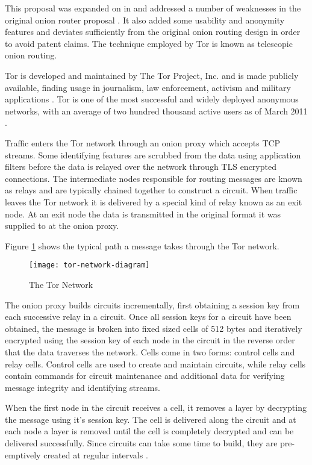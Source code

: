 \documentclass{ecuthesis}
\begin{document}
This proposal was expanded on in  and addressed a
number of weaknesses in the original onion router proposal
\parencite{Dingledine:2004p314}. It also added some usability and anonymity
features and deviates sufficiently from the original onion routing design in
order to avoid patent claims. The technique employed by Tor is known as
telescopic onion routing.

Tor is developed and maintained  by The Tor Project, Inc. and is made publicly
available, finding usage in journalism, law enforcement, activism and military
applications \parencite{The-Tor-Project-Inc.:2011uq}. Tor is one of the most
successful and widely deployed anonymous networks, with an average of two
hundred thousand active users as of March 2011
\parencite{The-Tor-Project-Inc.:2011fk}.

Traffic enters the Tor network through an onion proxy which accepts TCP streams.
Some identifying features are scrubbed from the data using application filters
before the data is relayed over the network through TLS \parencite{website:TLS}
encrypted connections. The intermediate nodes responsible for routing messages
are known as relays and are typically chained together to construct a circuit.
When traffic leaves the Tor network it is delivered by a special kind of relay
known as an exit node. At an exit node the data is transmitted in the original
format it was supplied to at the onion proxy.

Figure \ref{tor-network} shows the typical path a message takes through the Tor
network.

\begin{figure}[H]
  \centering\texttt{[image: tor-network-diagram]}
  \caption{The Tor Network}
  \label{tor-network}
\end{figure}

The onion proxy builds circuits incrementally, first obtaining a session key
from each successive relay in a circuit. Once all session keys for a circuit
have been obtained, the message is broken into fixed sized cells of 512 bytes
and iteratively encrypted using the session key of each node in the circuit in
the reverse order that the data traverses the network. Cells come in two forms:
control cells and relay cells. Control cells are used to create and maintain
circuits, while relay cells contain commands for circuit maintenance and
additional data for verifying message integrity and identifying streams.

When the first node in the circuit receives a cell, it removes a layer by
decrypting the message using it's session key. The cell is delivered along the
circuit and at each node a layer is removed until the cell is completely
decrypted and can be delivered successfully. Since circuits can take some time
to build, they are pre-emptively created at regular intervals
\parencite[5]{Dingledine:2004p314}.
\end{document}
